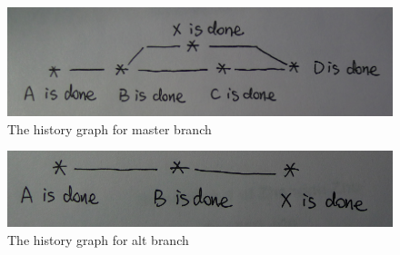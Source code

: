 \documentclass[12pt]{article}
\begin{document}
\begin{figure}[h]
    \begin{center}
        \includegraphics[scale=0.3]{grapha.png}
    \end{center}
    \caption{The history graph for master branch}
    \label{fig:branch}
\end{figure}

\begin{figure}[h]
    \begin{center}
        \includegraphics[scale=0.3]{graphb.png}
    \end{center}
    \caption{The history graph for alt branch}
    \label{fig:branch}
\end{figure}
\end{document}
